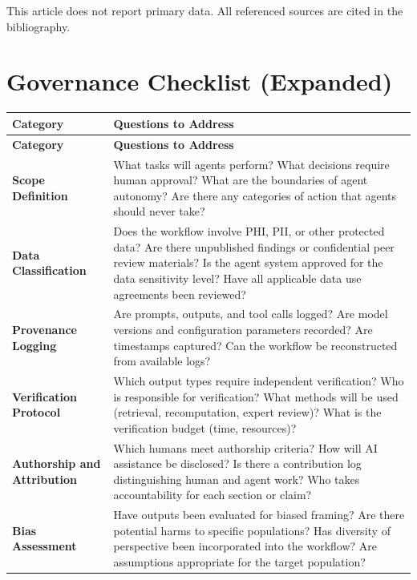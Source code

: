 \documentclass[11pt,letterpaper]{article}
\begin{document}
This article does not report primary data. All referenced sources are cited in the bibliography.



\newpage
\appendix

\section{Governance Checklist (Expanded)}
\label{app:checklist}

\begin{longtable}{p{}p{}}
\toprule
\textbf{Category} & \textbf{Questions to Address} \\
\midrule
\endfirsthead
\toprule
\textbf{Category} & \textbf{Questions to Address} \\
\midrule
\endhead
\midrule
\endfoot
\bottomrule
\endlastfoot

\textbf{Scope Definition} & 
What tasks will agents perform? What decisions require human approval? What are the boundaries of agent autonomy? Are there any categories of action that agents should never take? \\

\textbf{Data Classification} & 
Does the workflow involve PHI, PII, or other protected data? Are there unpublished findings or confidential peer review materials? Is the agent system approved for the data sensitivity level? Have all applicable data use agreements been reviewed? \\

\textbf{Provenance Logging} & 
Are prompts, outputs, and tool calls logged? Are model versions and configuration parameters recorded? Are timestamps captured? Can the workflow be reconstructed from available logs? \\

\textbf{Verification Protocol} & 
Which output types require independent verification? Who is responsible for verification? What methods will be used (retrieval, recomputation, expert review)? What is the verification budget (time, resources)? \\

\textbf{Authorship and Attribution} & 
Which humans meet authorship criteria? How will AI assistance be disclosed? Is there a contribution log distinguishing human and agent work? Who takes accountability for each section or claim? \\

\textbf{Bias Assessment} & 
Have outputs been evaluated for biased framing? Are there potential harms to specific populations? Has diversity of perspective been incorporated into the workflow? Are assumptions appropriate for the target population? \\


\end{longtable}
\end{document}
